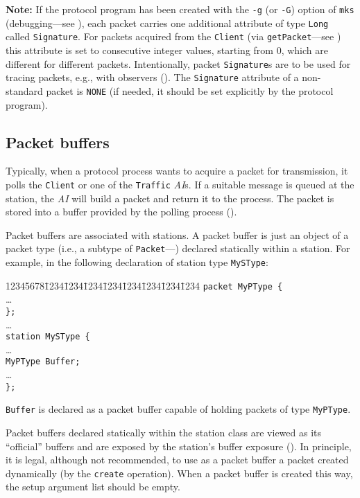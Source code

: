 \medskip

\noindent
{\bf Note:} If the protocol program has been created with the 
{\tt -g} (or {\tt -G})
option of {\tt mks} (debugging---see ), each packet
carries one additional attribute of type {\tt Long} called {\tt Signature}.
For packets acquired from the {\tt Client} (via {\tt getPacket}---see
) this attribute is set to consecutive integer values,
starting from 0, which are different for different packets.
Intentionally, packet {\tt Signature}s are to be used for tracing
packets, e.g., with observers ().
The {\tt Signature} attribute of a non-standard packet is {\tt NONE}
(if needed, it should be set explicitly by the protocol program).

\subsection{Packet buffers}
\label{rm_cl_pb}

Typically,
when a protocol process wants to acquire a packet for transmission, it
polls the {\tt Client} or one of the {\tt Traffic} {\em AI\/}s.
If a suitable message is queued at the station, the {\em AI\/} will
build a packet and return it to the process.
The packet is stored into a buffer provided by the polling process
().

Packet buffers are associated with stations.
A packet buffer is just an object of a packet type (i.e., a subtype of
{\tt Packet}---) declared statically within a
station.
For example, in the following declaration of station type {\tt MySType}:
{\tt\begin{tabbing}
12345678\=1234\=1234\=1234\=1234\=1234\=1234\=1234\=1234\kill
\> {\tt packet MyPType \{} \\
\> \> \ldots \\
\> {\tt \};} \\
\> \ldots \\
\> {\tt station MySType \{} \\
\> \> \ldots \\
\> \> {\tt MyPType Buffer; } \\
\> \> \ldots \\
\> {\tt \};}
\end{tabbing}}
\noindent
{\tt Buffer} is declared as a packet buffer capable of holding packets of type
{\tt MyPType}.

Packet buffers declared statically within the station class are viewed
as its ``official'' buffers and are exposed by the station's buffer
exposure ().
In principle, it is legal, although not
recommended, to use as a packet buffer a packet created
dynamically (by the {\tt create} operation).
When a packet buffer is created this way, the setup
argument list should be empty.

